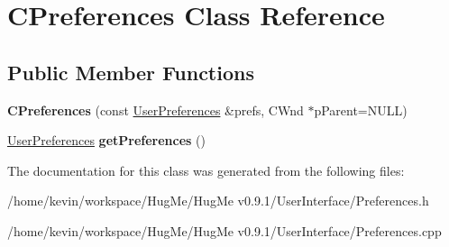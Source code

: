 \hypertarget{classCPreferences}{
\section{CPreferences Class Reference}
\label{classCPreferences}
}
\subsection*{Public Member Functions}
\begin{DoxyCompactItemize}
\item 
\hypertarget{classCPreferences_a1cb351f755d05386588ed3b808cd336e}{
{\bfseries CPreferences} (const \hyperlink{structUserPreferences}{UserPreferences} \&prefs, CWnd $\ast$pParent=NULL)}
\label{classCPreferences_a1cb351f755d05386588ed3b808cd336e}

\item 
\hypertarget{classCPreferences_ad9add852953664688eddff62189bec05}{
\hyperlink{structUserPreferences}{UserPreferences} {\bfseries getPreferences} ()}
\label{classCPreferences_ad9add852953664688eddff62189bec05}

\end{DoxyCompactItemize}


The documentation for this class was generated from the following files:\begin{DoxyCompactItemize}
\item 
/home/kevin/workspace/HugMe/HugMe v0.9.1/UserInterface/Preferences.h\item 
/home/kevin/workspace/HugMe/HugMe v0.9.1/UserInterface/Preferences.cpp\end{DoxyCompactItemize}
